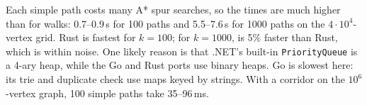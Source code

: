 Each simple path costs many A* spur searches, so the times are much higher than for walks: 0.7--0.9\,s for 100 paths
and 5.5--7.6\,s for 1000 paths on the $4\cdot 10^4$-vertex grid. Rust is fastest for $k=100$; for $k=1000$, \cs{} is
5\% faster than Rust, which is within noise. One likely reason is that .NET's built-in \texttt{PriorityQueue} is a
4-ary heap, while the Go and Rust ports use binary heaps. Go is slowest here: its trie and duplicate check use maps
keyed by strings. With a corridor on the $10^6$-vertex graph, 100 simple paths take 35--96\,ms.
